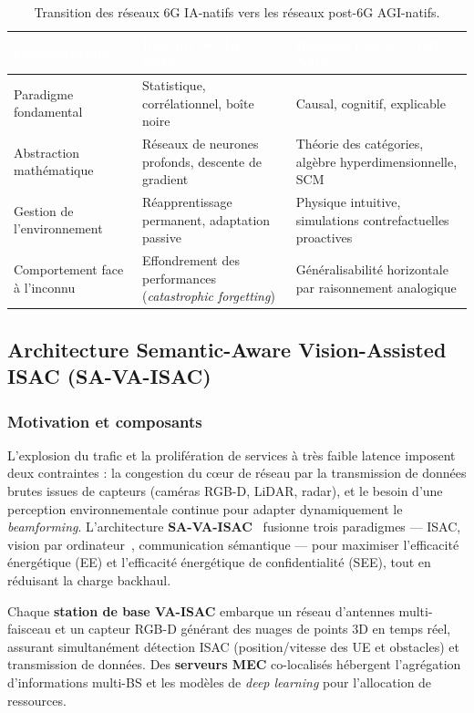 \documentclass[12pt,a4paper,titlepage]{article}
\newcommand{\hd}[1]{\textcolor{white}{\textbf{#1}}}
\begin{document}
\begin{table}[H]
    \centering
    \caption{Transition des réseaux 6G IA-natifs vers les réseaux post-6G AGI-natifs.}
    \label{tab:agi_transition}
    \begin{tabularx}{\textwidth}{F{3.4cm}LL}
        \toprule
        \hd{Caractéristique} & \hd{Réseaux 6G IA-Natifs} & \hd{Réseaux Post-6G AGI-Natifs} \\
        \midrule
        Paradigme fondamental & Statistique, corrélationnel, boîte noire & Causal, cognitif, explicable \\
        Abstraction mathématique & Réseaux de neurones profonds, descente de gradient & Théorie des catégories, algèbre hyperdimensionnelle, SCM \\
        Gestion de l'environnement & Réapprentissage permanent, adaptation passive & Physique intuitive, simulations contrefactuelles proactives \\
        Comportement face à l'inconnu & Effondrement des performances (\textit{catastrophic forgetting}) & Généralisabilité horizontale par raisonnement analogique \\
        \bottomrule
    \end{tabularx}
\end{table}

\subsection{Architecture Semantic-Aware Vision-Assisted ISAC (SA-VA-ISAC)}
\label{subsec:sa_va_isac}

\subsubsection{Motivation et composants}

L'explosion du trafic et la prolifération de services à très faible latence imposent deux contraintes : la congestion du c\oe ur de réseau par la transmission de données brutes issues de capteurs (caméras RGB-D, LiDAR, radar), et le besoin d'une perception environnementale continue pour adapter dynamiquement le \textit{beamforming}. L'architecture \textbf{SA-VA-ISAC}~\cite{sa_va_isac_main} fusionne trois paradigmes --- ISAC, vision par ordinateur~\cite{vision_isac}, communication sémantique --- pour maximiser l'efficacité énergétique (EE) et l'efficacité énergétique de confidentialité (SEE), tout en réduisant la charge backhaul.

Chaque \textbf{station de base VA-ISAC} embarque un réseau d'antennes multi-faisceau et un capteur RGB-D générant des nuages de points 3D en temps réel, assurant simultanément détection ISAC (position/vitesse des UE et obstacles) et transmission de données. Des \textbf{serveurs MEC} co-localisés hébergent l'agrégation d'informations multi-BS et les modèles de \textit{deep learning} pour l'allocation de ressources.
\end{document}
